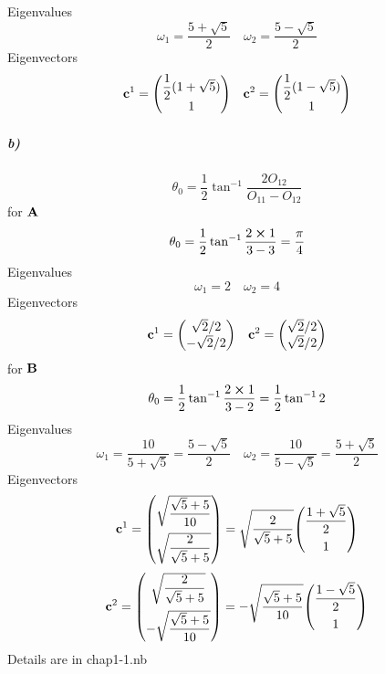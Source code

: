 \documentclass[a4paper]{article}
\newcommand{\subex}[1]{\subparagraph{#1}}
\numberwithin{equation}{subsection}
\newcommand{\code}[1]{\colorbox{codegray}{{\Consolas#1}}}
\begin{document}
Eigenvalues
\begin{equation}\label{key}
\omega_1 = \dfrac{5+\sqrt{5}}{2} \quad \omega_2 = \dfrac{5-\sqrt{5}}{2}
\end{equation}
Eigenvectors
\begin{equation}\label{key}
\vb{c}^1 = \mqty(\dfrac{1}{2}(1+\sqrt{5})\\1) \quad \vb{c}^2 = \mqty(\dfrac{1}{2}(1-\sqrt{5})\\1)
\end{equation}
\subex{b)}
\begin{equation}\label{key}
\theta_0 = \dfrac{1}{2}\tan^{-1}\dfrac{2O_{12}}{O_{11}-O_{12}}
\end{equation}
for $ \vb{A} $
\begin{equation}\label{key}
\theta_0 = \dfrac{1}{2}\tan^{-1}\dfrac{2\cross 1}{3-3} = \dfrac{\pi}{4} 
\end{equation}
Eigenvalues
\begin{equation}\label{key}
\omega_1 = 2 \quad \omega_2 = 4
\end{equation}
Eigenvectors
\begin{equation}\label{key}
\vb{c}^1 = \mqty(\sqrt{2}/2\\-\sqrt{2}/2) \quad \vb{c}^2 = \mqty(\sqrt{2}/2\\ \sqrt{2}/2)
\end{equation}
for $ \vb{B} $
\begin{equation}\label{key}
\theta_0 = \dfrac{1}{2}\tan^{-1}\dfrac{2\cross 1}{3-2} = \dfrac{1}{2}\tan^{-1}2 
\end{equation}
Eigenvalues
\begin{equation}\label{key}
\omega_1 = \dfrac{10}{5+\sqrt{5}} = \dfrac{5-\sqrt{5}}{2} \quad \omega_2 = \dfrac{10}{5-\sqrt{5}} = \dfrac{5+\sqrt{5}}{2}
\end{equation}
Eigenvectors
\begin{equation}\label{key}
\vb{c}^1 
= \mqty(\sqrt{\dfrac{\sqrt{5}+5}{10}}\vspace{5pt}\\ \sqrt{\dfrac{2}{\sqrt{5}+5}}) 
= \sqrt{\dfrac{2}{\sqrt{5}+5}} 
\mqty(\dfrac{1+\sqrt{5}}{2} \vspace{5pt}\\1) 
\end{equation}
\begin{equation}\label{key}
\vb{c}^2
= \mqty(\sqrt{\dfrac{2}{\sqrt{5}+5}}\vspace{5pt}\\ -\sqrt{\dfrac{\sqrt{5}+5}{10}}) 
= -\sqrt{\dfrac{\sqrt{5}+5}{10}}
\mqty(\dfrac{1-\sqrt{5}}{2} \vspace{5pt}\\1) 
\end{equation}
Details are in \code{chap1-1.nb}
\end{document}
